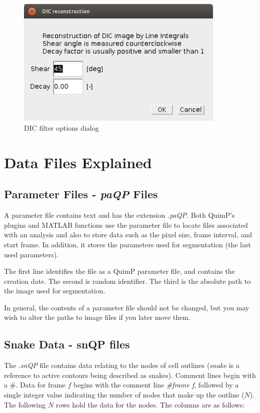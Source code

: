 \documentclass[a4paper,12pt]{article}
\begin{document}
\begin{figure}[ht]
	\centering
	\includegraphics[width=10cm]{DICwindow.png} 
	\caption{DIC filter options dialog}
	\label{fig:dicdialog}
\end{figure} 

\section{Data Files Explained}

\subsection{Parameter Files - \textit{paQP} Files}
\label{paQP}

A parameter file contains text and has the extension \textit{.paQP}.  Both QuimP's plugins and
MATLAB functions use the parameter file to locate files associated with an analysis and also to store data such as the
pixel size, frame interval, and start frame.  In addition, it stores the parameters used for segmentation
(the last used parameters).

The first line identifies the file as a QuimP parameter file, and contains the creation date.
The second is random identifier.
The third is the absolute path to the image used for segmentation.
 
In general, the contents of a parameter file should not be changed, but you may wish to alter the paths to
image files if you later move them.
 

\subsection{Snake Data - snQP files}
\label{snQP}

The \textit{.snQP} file contains data relating to the nodes of cell outlines (\textit{snake} is a reference to active contours being 
described as snakes).   Comment lines
begin with a \#.  Data for frame $f$ begins with the comment line \textit{\#frame f}, followed by a single integer value
indicating the number of nodes that make up the outline ($N$).  The following $N$ rows hold the data for the nodes. The 
columns are as follows:
\end{document}

